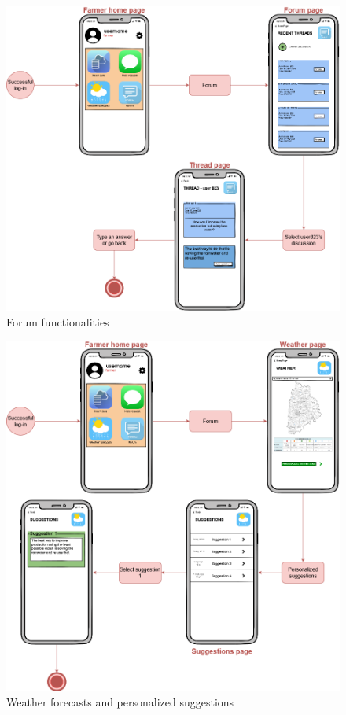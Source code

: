 \begin{center}
    \begin{figure}[H]
        \includegraphics[scale=0.42]{Images/UserInterface/Diagram/farmerForum.drawio.png}
        \caption{Forum functionalities}
    \end{figure}
\end{center}

\begin{center}
    \begin{figure}[H]
        \includegraphics[width=\textwidth]{Images/UserInterface/Diagram/farmerWeather.drawio.png}
        \caption{Weather forecasts and personalized suggestions}
    \end{figure}
\end{center}
\newpage

